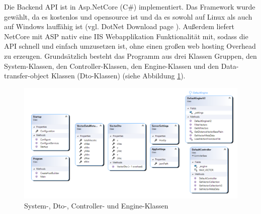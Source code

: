 Die Backend API ist in Asp.NetCore (C\#) implementiert.
Das Framework wurde gewählt, da es kostenlos und opensource
ist und da es sowohl auf Linux als auch auf Windows lauffähig ist
(vgl. DotNet Download page \cite{DotNetDownloadPage}).
Außerdem liefert NetCore mit ASP nativ eine IIS Webapplikation
Funktionalität mit, sodass die API schnell und einfach umzusetzen ist,
ohne einen großen web hosting Overhead zu erzeugen. Grundsätzlich
besteht das Programm aus drei Klassen Gruppen, den System-Klassen,
den Controller-Klassen, den Engine-Klassen und den Data-transfer-object
Klassen (Dto-Klassen) (siehe Abbildung \ref{fig:ClassDiagram}).\\
\begin{figure}[H]
	\centering
	\includegraphics[width=\linewidth]{images/backend/classDiagram}
	\caption{System-, Dto-, Controller- und Engine-Klassen}
	\label{fig:ClassDiagram}
\end{figure}
